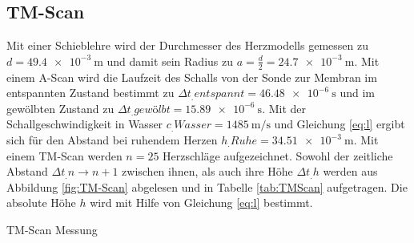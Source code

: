 \subsection{TM-Scan}
Mit einer Schieblehre wird der Durchmesser des Herzmodells gemessen zu $d=\SI{49,4e-3}{\metre}$ und damit sein Radius zu $a=\frac{d}{2}=\SI{24,7e-3}{\metre}$.
Mit einem A-Scan wird die Laufzeit des Schalls von der Sonde zur Membran im entspannten Zustand bestimmt zu $\Delta t_.{entspannt}= \SI{46,48e-6}{\second}$ und im gewölbten Zustand zu $\Delta t_.{gewölbt}= \SI{15,89e-6}{\second}$.\newline
Mit der Schallgeschwindigkeit in Wasser $c_.{Wasser}=\SI{1485}{\metre\per\second}$ und Gleichung \eqref{eq:l} ergibt sich für den Abstand bei ruhendem Herzen $h_.{Ruhe} = \SI{34,51e-3}{\metre}$.
Mit einem TM-Scan werden $n=25$ Herzschläge aufgezeichnet. Sowohl der zeitliche Abstand $\Delta t_.{n\rightarrow n+1}$ zwischen ihnen, als auch ihre Höhe $\Delta t_.h$ werden aus Abbildung \ref{fig:TM-Scan} abgelesen und in Tabelle \ref{tab:TMScan} aufgetragen.\newline
Die absolute Höhe $h$ wird mit Hilfe von Gleichung \ref{eq:l} bestimmt.\newline
\begin{table}
	\centering
	\caption{TM-Scan Messung}
	
	\label{tab:TMScan}
\end{table}

